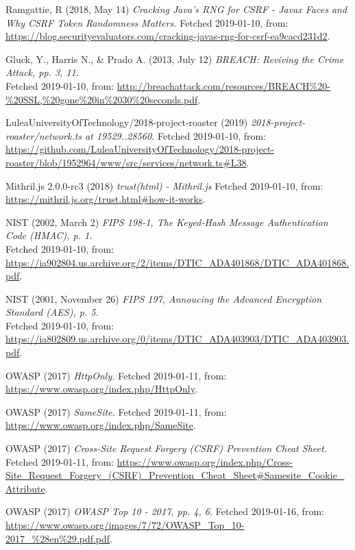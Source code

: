 \documentclass[12pt,a4paper]{report}
\begin{document}
\newpage
\apptocmd{\sloppy}{\hbadness 10000\relax}{}{} 
{\RaggedRight\begin{thebibliography}{1}

Ramgattie, R (2018, May 14) {\em  Cracking Java’s RNG for CSRF - Javax Faces and Why CSRF Token Randomness Matters.}
Fetched 2019-01-10, from:
\url{https://blog.securityevaluators.com/cracking-javas-rng-for-csrf-ea9cacd231d2}.

Gluck, Y., Harris N., \& Prado A. (2013, July 12) {\em BREACH: Reviving the Crime Attack, pp. 3, 11.} \\
Fetched 2019-01-10, from:
\url{http://breachattack.com/resources/BREACH\%20-\%20SSL,\%20gone\%20in\%2030\%20seconds.pdf}.

LuleaUniversityOfTechnology/2018-project-roaster (2019) {\em 2018-project-roaster/network.ts at 19529..28560.}
Fetched 2019-01-10, from:
\url{https://github.com/LuleaUniversityOfTechnology/2018-project-roaster/blob/1952964/www/src/services/network.ts#L38}.

Mithril.js 2.0.0-rc3 (2018) {\em trust(html) - Mithril.js}
Fetched 2019-01-10, from:
\url{https://mithril.js.org/trust.html#how-it-works}.

NIST (2002, March 2) {\em FIPS 198-1, The Keyed-Hash Message Authentication Code (HMAC), p. 1.} \\
Fetched 2019-01-10, from:
\url{https://ia902804.us.archive.org/2/items/DTIC_ADA401868/DTIC_ADA401868.pdf}.

NIST (2001, November 26) {\em FIPS 197, Annoucing the Advanced Encryption Standard (AES), p. 5.} \\
Fetched 2019-01-10, from:
\url{https://ia802809.us.archive.org/0/items/DTIC_ADA403903/DTIC_ADA403903.pdf}.

OWASP (2017) {\em HttpOnly.} Fetched 2019-01-11, from:
\url{https://www.owasp.org/index.php/HttpOnly}.

OWASP (2017) {\em SameSite.} Fetched 2019-01-11, from:
\url{https://www.owasp.org/index.php/SameSite}.

OWASP (2017) {\em Cross-Site Request Forgery (CSRF) Prevention Cheat Sheet.} Fetched 2019-01-11, from:
\url{https://www.owasp.org/index.php/Cross-Site_Request_Forgery_(CSRF)_Prevention_Cheat_Sheet#Samesite_Cookie_Attribute}.

OWASP (2017) {\em OWASP Top 10 - 2017, pp. 4, 6.} Fetched 2019-01-16, from: \url{https://www.owasp.org/images/7/72/OWASP_Top_10-2017_\%28en\%29.pdf.pdf}.


\end{thebibliography}}
\end{document}
